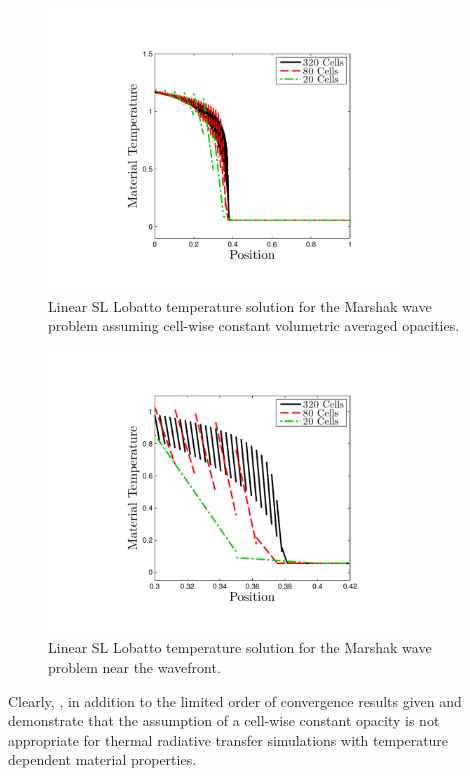 %
%
\begin{figure}[!hbp]
\centering
\includegraphics[width=9.5cm,trim=1.2in  0.2in 0.75in 0.5in,clip=true]{chapter6_grey_radtran/Dissertation_Data/Reorder_Blading_Temperature_Full_MultiCell.pdf}
\caption{Linear SL Lobatto temperature solution for the Marshak wave problem assuming cell-wise constant volumetric averaged opacities.}
\label{fig:bladed_t_profile_full}
\end{figure}
%
%
\begin{figure}[!htp]
\centering
\includegraphics[width=9.5cm,trim=1.2in  0.2in 0.75in 0.5in,clip=true]{chapter6_grey_radtran/Dissertation_Data/Reorder_Blading_Temperature_Zoom_MultiCell.pdf}
\caption{Linear SL Lobatto temperature solution for the Marshak wave problem near the wavefront.}
\label{fig:bladed_t_profile_zoom}
\end{figure}
Clearly, , in addition to the limited order of convergence results given  and  demonstrate that the assumption of a cell-wise constant opacity is not appropriate for thermal radiative transfer simulations with temperature dependent material properties.

